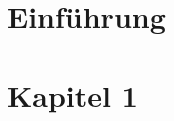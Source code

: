 \documentclass[../main.tex]{subfiles}
\begin{document}
\begin{abstract}
    \lipsum[1-2]
\end{abstract}

\section{Einführung}
\lipsum[1-2]

\newpage

\section{Kapitel 1}
\end{document}

